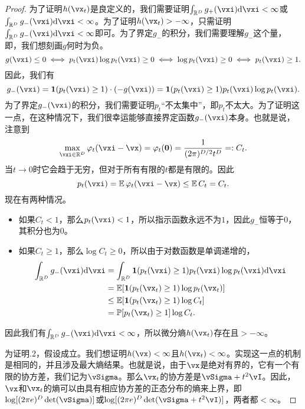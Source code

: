 \documentclass[../../book-main_zh.tex]{subfiles}
\begin{document}
\begin{proof}
    为了证明\(h(\vx_{t})\)是良定义的，我们需要证明\(\int_{\R^{D}}g_{+}(\vxi)\odif{\vxi} < \infty\)或\(\int_{\R^{D}}g_{-}(\vxi) \odif{\vxi} < \infty\)。为了证明\(h(\vx_{t}) > -\infty\)，只需证明\(\int_{\R^{D}}g_{-}(\vxi)\odif{\vxi} < \infty\)即可。为了界定\(g_{-}\)的积分，我们需要理解\(g_{-}\)这个量，即，我们想刻画\(g\)何时为负。
    \begin{equation}
        g(\vxi) \leq 0 \iff p_{t}(\vxi)\log p_{t}(\vxi) \geq 0 \iff \log p_{t}(\vxi) \geq 0 \iff p_{t}(\vxi) \geq 1.
    \end{equation}
    因此，我们有
    \begin{equation}
        g_{-}(\vxi) = \indvar(p_{t}(\vxi) \geq 1)\cdot (-g(\vxi)) = \indvar(p_{t}(\vxi) \geq 1)p_{t}(\vxi)\log p_{t}(\vxi).
    \end{equation}
    为了界定\(g_{-}(\vxi)\)的积分，我们需要证明\(p_{t}\)“不太集中”，即\(p_{t}\)不太大。为了证明这一点，在这种情况下，我们很幸运能够直接界定函数\(g_{-}(\vxi)\)本身。也就是说，注意到
    \begin{equation}
        \max_{\vxi \in \R^{D}}\phi_{t}(\vxi - \vx) = \phi_{t}(\vzero) = \frac{1}{(2\pi)^{D/2}t^{D}} =: C_{t}.
    \end{equation}
    当\(t \to 0\)时它会趋于无穷，但对于所有有限的\(t\)都是有限的。因此
    \begin{equation}
        p_{t}(\vxi) = \Ex \phi_{t}(\vxi - \vx) \leq \Ex C_{t} = C_{t}.
    \end{equation}
    现在有两种情况。
    \begin{itemize}
        \item 如果\(C_{t} < 1\)，那么\(p_{t}(\vxi) < 1\)，所以指示函数永远不为\(1\)，因此\(g_{-}\)恒等于\(0\)，其积分也为\(0\)。
        \item 如果\(C_{t} \geq 1\)，那么\(\log C_{t} \geq 0\)，所以由于对数函数是单调递增的，
        \begin{align}
            \int_{\R^{D}}g_{-}(\vxi)\odif{\vxi}
            &= \int_{\R^{D}}\indvar(p_{t}(\vxi) \geq 1)p_{t}(\vxi)\log p_{t}(\vxi)\odif{\vxi}  \\ 
            &= \Ex[\indvar(p_{t}(\vx_{t}) \geq 1)\log p_{t}(\vx_{t})]  \\ 
            &\leq \Ex[\indvar(p_{t}(\vx_{t}) \geq 1) \log C_{t}] \\ 
            &= \Pr[p_{t}(\vx_{t}) \geq 1]\log C_{t}.
        \end{align}
    \end{itemize}
    因此我们有\(\int_{\R^{D}}g_{-}(\vxi)\odif{\vxi} < \infty\)，所以微分熵\(h(\vx_{t})\)存在且\(> -\infty\)。

    为证明.2，假设成立。我们想证明\(h(\vx) < \infty\)且\(h(\vx_{t}) < \infty\)。实现这一点的机制是相同的，并且涉及最大熵结果。也就是说，由于\(\vx\)是绝对有界的，它有一个有限的协方差，我们记为\(\vSigma\)。那么\(\vx_{t}\)的协方差是\(\vSigma + t^{2}\vI\)。因此，\(\vx\)和\(\vx_{t}\)的熵可以由具有相应协方差的正态分布的熵来上界，即\(\log[(2\pi e)^{D}\det(\vSigma)]\)或\(\log[(2\pi e)^{D}\det(\vSigma + t^{2}\vI)]\)，两者都\(< \infty\)。
\end{proof}
\end{document}
